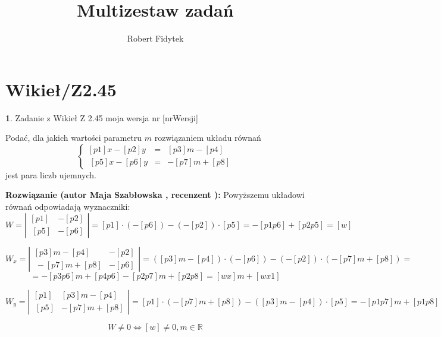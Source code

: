 \documentclass[12pt, a4paper]{article}
\title{Multizestaw zadań}
\author{Robert Fidytek}
\date{}
\theoremstyle{definition} %
\newtheorem{zad}{}
\newcommand{\kategoria}[1]{\section{#1}} %
\newcommand{\zadStart}[1]{\begin{zad}#1\newline} %
\newcommand{\zadStop}{\end{zad}}   %
\newcommand{\rozwStart}[2]{\noindent \textbf{Rozwiązanie (autor #1 , recenzent #2): }\newline} %
\begin{document}
\maketitle


\kategoria{Wikieł/Z2.45}
\zadStart{Zadanie z Wikieł Z 2.45  moja wersja nr [nrWersji]}

Podać, dla jakich wartości parametru $m$ rozwiązaniem układu równań
$$\left\{\begin{array}{ccc}
[p1]x-[p2]y&=&[p3]m-[p4]\\
\ [p5]x-[p6]y&=&-[p7]m+[p8]
\end{array} \right.$$
jest para liczb ujemnych. 
\zadStop

\rozwStart{Maja Szabłowska}{}
Powyższemu układowi równań odpowiadają wyznaczniki:
$$W=\left| \begin{array}{lccr} [p1] & -[p2] \\ \ [p5] & -[p6] \end{array}\right| = [p1]\cdot(-[p6]) - (-[p2])\cdot[p5]=-[p1p6]+[p2p5]=[w]$$

$$W_{x}=\left| \begin{array}{lccr} [p3]m -[p4] & -[p2] \\ \ -[p7]m+[p8] & -[p6] \end{array}\right| = ([p3]m-[p4])\cdot(-[p6]) - (- [p2])\cdot(-[p7]m+[p8])=$$
$$=-[p3p6]m+[p4p6]-[p2p7]m+[p2p8]=[wx]m+[wx1]$$

$$W_{y}=\left| \begin{array}{lccr} [p1] & [p3]m-[p4] \\ \ [p5] & -[p7]m+[p8] \end{array}\right| = [p1]\cdot(-[p7]m+[p8]) - ([p3]m-[p4])\cdot[p5]=-[p1p7]m+[p1p8]-[p3p5]m+[p4p5]=[wy]m+[wy1]$$

$$W\neq 0 \iff [w] \neq 0, m\in\mathbb{R} $$
\end{document}
